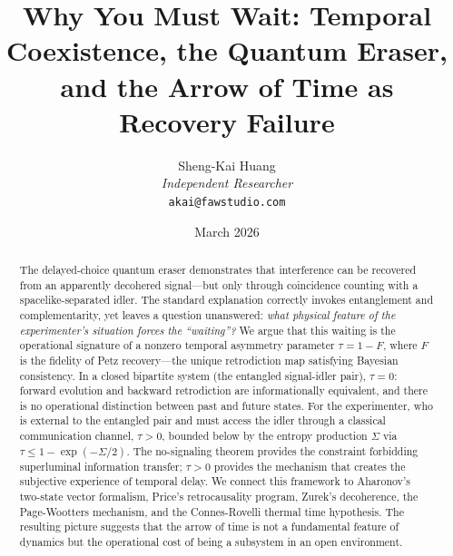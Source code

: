 \documentclass[12pt]{article}
\theoremstyle{definition}
\theoremstyle{remark}
\newcommand{\tauasym}{\tau}
\begin{document}
\title{\textbf{Why You Must Wait: Temporal Coexistence, the Quantum Eraser,\\
and the Arrow of Time as Recovery Failure}}

\author{Sheng-Kai Huang\\
\textit{Independent Researcher}\\
\texttt{akai@fawstudio.com}}

\date{March 2026}

\maketitle

\begin{abstract}

The delayed-choice quantum eraser demonstrates that
interference can be recovered from an apparently decohered signal---but
only through coincidence counting with a spacelike-separated idler.
The standard explanation correctly invokes entanglement and
complementarity, yet leaves a question unanswered: \emph{what physical
feature of the experimenter's situation forces the ``waiting''?}
We argue that this waiting is the operational signature of a nonzero
temporal asymmetry parameter $\tauasym = 1 - F$, where $F$ is the
fidelity of Petz recovery---the unique retrodiction map satisfying
Bayesian consistency.  In a closed bipartite system (the entangled
signal-idler pair), $\tauasym = 0$: forward evolution and backward
retrodiction are informationally equivalent, and there is no operational
distinction between past and future states.  For the experimenter,
who is external to the entangled pair and must access the idler through
a classical communication channel, $\tauasym > 0$, bounded below by
the entropy production $\Sigma$ via $\tauasym \leq 1 - \exp(-\Sigma/2)$.
The no-signaling theorem provides the constraint forbidding
superluminal information transfer; $\tauasym > 0$ provides the
mechanism that creates the subjective experience of temporal delay.
We connect this framework to Aharonov's two-state vector formalism,
Price's retrocausality program, Zurek's decoherence, the
Page-Wootters mechanism, and the Connes-Rovelli thermal time hypothesis.
The resulting picture suggests that the arrow of time is not a
fundamental feature of dynamics but the operational cost of being a
subsystem in an open environment.

\end{abstract}
\end{document}
